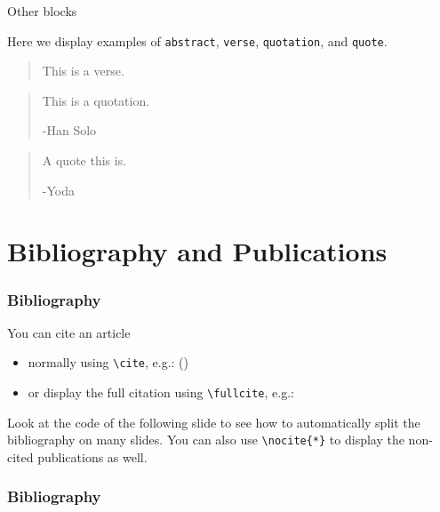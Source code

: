 \documentclass{article}
\begin{document}
\begin{frame}{Other blocks}

Here we display examples of \texttt{abstract}, \texttt{verse}, \texttt{quotation}, and \texttt{quote}.

\vskip 0.5cm

\begin{abstract}
This is an abstract.
\end{abstract}
\begin{verse}
This is a verse.
\end{verse}
\begin{quotation}
This is a quotation.

\raggedleft -Han Solo
\end{quotation}
\begin{quote}
A quote this is.

\raggedleft -Yoda
\end{quote}

\end{frame}

\section{Bibliography and Publications}
\begin{frame}[fragile]
\frametitle{Bibliography}

You can cite an article
\begin{itemize}
\item normally using \texttt{\textbackslash cite}, e.g.: (\cite{article1})
\item or display the full citation using \texttt{\textbackslash fullcite}, e.g.:  
\end{itemize}

\vskip 0.5cm
Look at the code of the following slide to see how to automatically split the bibliography on many slides. You can also use \texttt{\textbackslash nocite\{*\}} to display the non-cited publications as well.

\end{frame}

\begin{frame}[t,allowframebreaks]
\frametitle{Bibliography}

\nocite{*} %

\printbibliography

\end{frame}
\end{document}
